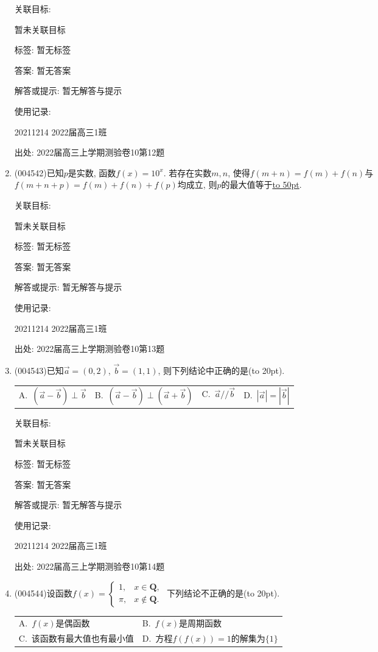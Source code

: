 \documentclass[10pt,a4paper]{article}
\newcommand{\blank}[1]{\underline{\hbox to #1pt{}}}
\newcommand{\bracket}[1]{(\hbox to #1pt{})}
\newcommand{\twoch}[4]{\par\begin{tabular}{p{.46\textwidth}p{.46\textwidth}}
A.~#1& B.~#2\\
C.~#3& D.~#4
\end{tabular}}
\newcommand{\fourch}[4]{\par\begin{tabular}{p{.23\textwidth}p{.23\textwidth}p{.23\textwidth}p{.23\textwidth}}
A.~#1 &B.~#2& C.~#3& D.~#4
\end{tabular}}
\begin{document}
\begin{enumerate}[1.]
关联目标:

暂未关联目标



标签: 暂无标签

答案: 暂无答案

解答或提示: 暂无解答与提示

使用记录:

20211214	2022届高三1班	


出处: 2022届高三上学期测验卷10第12题
\item { (004542)}已知$p$是实数, 函数$f(x)=10^x$. 若存在实数$m,n$, 使得$f(m+n)=f(m)+f(n)$与$f(m+n+p)=f(m)+f(n)+f(p)$均成立, 则$p$的最大值等于\blank{50}.


关联目标:

暂未关联目标



标签: 暂无标签

答案: 暂无答案

解答或提示: 暂无解答与提示

使用记录:

20211214	2022届高三1班	


出处: 2022届高三上学期测验卷10第13题
\item { (004543)}已知$\overrightarrow a=(0,2)$, $\overrightarrow b=(1,1)$, 则下列结论中正确的是\bracket{20}.
\fourch{$(\overrightarrow a-\overrightarrow b)\perp \overrightarrow b$}{$(\overrightarrow a-\overrightarrow b)\perp (\overrightarrow a+\overrightarrow b)$}{$\overrightarrow a//\overrightarrow b$}{$|\overrightarrow a|=|\overrightarrow b|$}


关联目标:

暂未关联目标



标签: 暂无标签

答案: 暂无答案

解答或提示: 暂无解答与提示

使用记录:

20211214	2022届高三1班	


出处: 2022届高三上学期测验卷10第14题
\item { (004544)}设函数$f(x)=\begin{cases}1, & x\in \mathbf{Q}, \\ \pi, &x\not\in \mathbf{Q}.\end{cases}$ 下列结论不正确的是\bracket{20}.
\twoch{$f(x)$是偶函数}{$f(x)$是周期函数}{该函数有最大值也有最小值}{方程$f(f(x))=1$的解集为$\{1\}$}



\end{enumerate}
\end{document}
